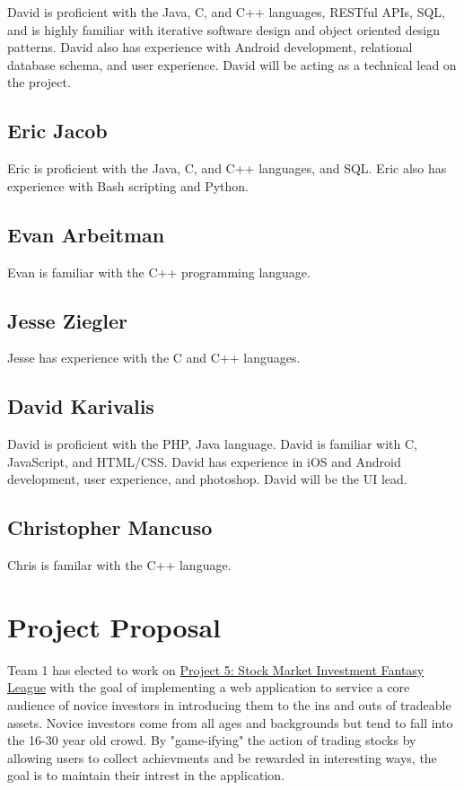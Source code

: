 \documentclass[11pt,letterpaper,oneside]{memoir}
\begin{document}
David is proficient with the Java, C, and C++ languages, RESTful APIs, SQL, and is
highly familiar with iterative software design and object oriented design patterns.
David also has experience with Android development, relational database schema, and
user experience.  David will be acting as a technical lead on the project.

\section{Eric Jacob}

Eric is proficient with the Java, C, and C++ languages, and SQL.  Eric also has
experience with Bash scripting and Python.

\section{Evan Arbeitman}

Evan is familiar with the C++ programming language.

\section{Jesse Ziegler}

Jesse has experience with the C and C++ languages.

\section{David Karivalis}

David is proficient with the PHP, Java language. David is familiar with C, JavaScript, and HTML/CSS.
David has experience in iOS and Android development, user experience, and photoshop.  David will be
the UI lead.

\section{Christopher Mancuso}

Chris is familar with the C++ language.

\chapter{Project Proposal}
\label{proposal}
Team 1 has elected to work on \href{http://ece.rutgers.edu/~marsic/books/SE/projects/}
{Project 5: Stock Market Investment Fantasy League} with the goal of implementing a
web application to service a core audience of novice investors in introducing them to
the ins and outs of tradeable assets.  Novice investors come from all ages and backgrounds
but tend to fall into the 16-30 year old crowd.  By "game-ifying" the action of trading
stocks by allowing users to collect achievments and be rewarded in interesting ways, the
goal is to maintain their intrest in the application.
\end{document}
